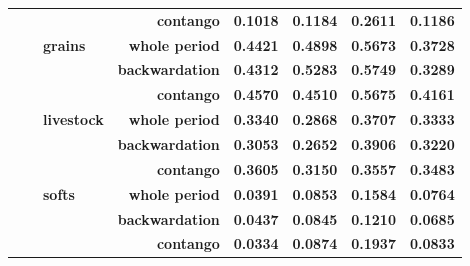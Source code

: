 \documentclass[
  authoryear,
  preprint,
  3p]{elsarticle}
\begin{document}
\begin{longtable}[t]{>{}l>{}l>{}l>{}r>{}r>{}r>{}r>{}r}
\textbf{} & \textbf{} & \textbf{} & \textbf{contango} & \textcolor[HTML]{4285f4}{\textbf{0.1018}} & \textcolor[HTML]{4285f4}{\textbf{0.1184}} & \textcolor[HTML]{4285f4}{\textbf{0.2611}} & \textcolor[HTML]{4285f4}{\textbf{0.1186}}\\
\textbf{} & \textbf{} & \textbf{grains} & \textbf{whole period} & \textcolor[HTML]{4285f4}{\textbf{0.4421}} & \textcolor[HTML]{4285f4}{\textbf{0.4898}} & \textcolor[HTML]{4285f4}{\textbf{0.5673}} & \textcolor[HTML]{4285f4}{\textbf{0.3728}}\\
\addlinespace
\textbf{} & \textbf{} & \textbf{} & \textbf{backwardation} & \textcolor[HTML]{4285f4}{\textbf{0.4312}} & \textcolor[HTML]{4285f4}{\textbf{0.5283}} & \textcolor[HTML]{4285f4}{\textbf{0.5749}} & \textcolor[HTML]{4285f4}{\textbf{0.3289}}\\
\textbf{} & \textbf{} & \textbf{} & \textbf{contango} & \textcolor[HTML]{4285f4}{\textbf{0.4570}} & \textcolor[HTML]{4285f4}{\textbf{0.4510}} & \textcolor[HTML]{4285f4}{\textbf{0.5675}} & \textcolor[HTML]{4285f4}{\textbf{0.4161}}\\
\textbf{} & \textbf{} & \textbf{livestock} & \textbf{whole period} & \textcolor[HTML]{4285f4}{\textbf{0.3340}} & \textcolor[HTML]{4285f4}{\textbf{0.2868}} & \textcolor[HTML]{4285f4}{\textbf{0.3707}} & \textcolor[HTML]{4285f4}{\textbf{0.3333}}\\
\textbf{} & \textbf{} & \textbf{} & \textbf{backwardation} & \textcolor[HTML]{4285f4}{\textbf{0.3053}} & \textcolor[HTML]{4285f4}{\textbf{0.2652}} & \textcolor[HTML]{4285f4}{\textbf{0.3906}} & \textcolor[HTML]{4285f4}{\textbf{0.3220}}\\
\textbf{} & \textbf{} & \textbf{} & \textbf{contango} & \textcolor[HTML]{4285f4}{\textbf{0.3605}} & \textcolor[HTML]{4285f4}{\textbf{0.3150}} & \textcolor[HTML]{4285f4}{\textbf{0.3557}} & \textcolor[HTML]{4285f4}{\textbf{0.3483}}\\
\addlinespace
\textbf{} & \textbf{} & \textbf{softs} & \textbf{whole period} & \textcolor[HTML]{4285f4}{\textbf{0.0391}} & \textcolor[HTML]{4285f4}{\textbf{0.0853}} & \textcolor[HTML]{4285f4}{\textbf{0.1584}} & \textcolor[HTML]{4285f4}{\textbf{0.0764}}\\
\textbf{} & \textbf{} & \textbf{} & \textbf{backwardation} & \textcolor[HTML]{4285f4}{\textbf{0.0437}} & \textcolor[HTML]{4285f4}{\textbf{0.0845}} & \textcolor[HTML]{4285f4}{\textbf{0.1210}} & \textcolor[HTML]{4285f4}{\textbf{0.0685}}\\
\textbf{} & \textbf{} & \textbf{} & \textbf{contango} & \textcolor[HTML]{4285f4}{\textbf{0.0334}} & \textcolor[HTML]{4285f4}{\textbf{0.0874}} & \textcolor[HTML]{4285f4}{\textbf{0.1937}} & \textcolor[HTML]{4285f4}{\textbf{0.0833}}\\

\end{longtable}
\end{document}
